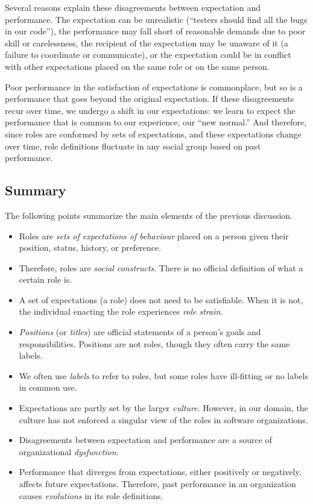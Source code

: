 \documentclass[10pt, conference, compsocconf]{IEEEtran}
\begin{document}
Several reasons explain these disagreements between expectation and performance. The expectation can be unrealistic (``testers should find all the bugs in our code''), the performance may fall short of reasonable demands due to poor skill or carelessness, the recipient of the expectation may be unaware of it (a failure to coordinate or communicate), or the expectation could be in conflict with other expectations placed on the same role or on the same person.

Poor performance in the satisfaction of expectations is commonplace, but so is a performance that goes beyond the original expectation. If these disagreements recur over time, we undergo a shift in our expectations: we learn to expect the performance that is common to our experience, our ``new normal.'' And therefore, since roles are conformed by sets of expectations, and these expectations change over time, role definitions fluctuate in any social group based on past performance. 


\subsection{Summary}

The following points summarize the main elements of the previous discussion.

\begin{itemize}
\item Roles are \emph{sets of expectations of behaviour} placed on a person given their position, status, history, or preference.

\item Therefore, roles are \emph{social constructs}. There is no official definition of what a certain role is.

\item A set of expectations (a role) does not need to be satisfiable. When it is not, the individual enacting the role experiences \emph{role strain}.

\item \emph{Positions} (or \emph{titles}) are official statements of a person's goals and responsibilities. Positions are not roles, though they often carry the same labels.

\item We often use \emph{labels} to refer to roles, but some roles have ill-fitting or no labels in common use.

\item Expectations are partly set by the larger \emph{culture}. However, in our domain, the culture has not enforced a singular view of the roles in software organizations.

\item Disagreements between expectation and performance are a source of organizational \emph{dysfunction}.

\item Performance that diverges from expectations, either positively or negatively, affects future expectations. Therefore, past performance in an organization causes \emph{evolutions} in its role definitions.
\end{itemize}
\end{document}
